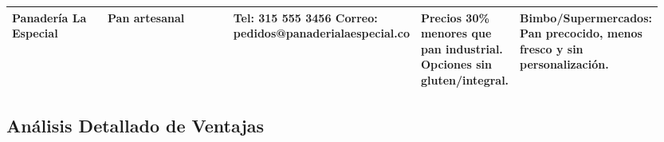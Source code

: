 \documentclass[letterpaper, 11pt]{report}
\begin{document}
\begin{longtable}{|p{0.15\linewidth}|p{0.20\linewidth}|p{0.25\linewidth}|p{0.15\linewidth}|p{0.20\linewidth}|}
      \hline
      Panadería La Especial                                                                                                   & Pan artesanal                & Tel: 315 555 3456 \hfil \break Correo: pedidos@panaderialaespecial.co &
      Precios 30\% menores que pan industrial. \hfil \break Opciones sin gluten/integral.                                     &
      Bimbo/Supermercados: Pan precocido, menos fresco y sin personalización.                                                                                                                                                                                                                               \\
      \hline
\end{longtable}

\subsection{Análisis Detallado de Ventajas}
\end{document}
